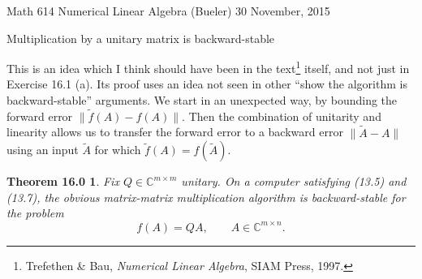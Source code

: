 \documentclass[12pt]{amsart}
\newtheorem*{thm}{Theorem 16.0}
\newcommand{\CC}{\mathbb{C}}
\begin{document}
\scriptsize \noindent Math 614 Numerical Linear Algebra (Bueler) \hfill 30 November, 2015
\normalsize

\medskip\bigskip
\Large
\centerline{Multiplication by a unitary matrix is backward-stable}

\bigskip\medskip
\normalsize

\thispagestyle{empty}

This is an idea which I think should have been in the text\footnote{Trefethen \& Bau, \emph{Numerical Linear Algebra}, SIAM Press, 1997.} itself, and not just in Exercise 16.1 (a).  Its proof uses an idea not seen in other ``show the algorithm is backward-stable'' arguments.  We start in an unexpected way, by bounding the forward error $\|\tilde f(A)-f(A)\|$.  Then the combination of unitarity and linearity allows us to transfer the forward error to a backward error $\|\tilde A - A\|$ using an input $\tilde A$ for which $\tilde f(A) = f(\tilde A)$.

\medskip
\begin{thm}
Fix $Q\in\CC^{m\times m}$ unitary.  On a computer satisfying (13.5) and (13.7), the obvious matrix-matrix multiplication algorithm is backward-stable for the problem
    $$f(A) = QA, \qquad A\in\CC^{m\times n}.$$
\end{thm}
\end{document}
